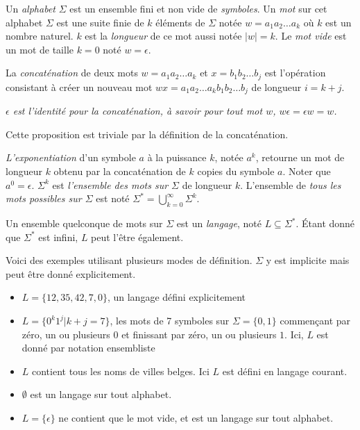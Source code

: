 Un \emph{alphabet} $\Sigma$ est un ensemble fini et non vide de \emph{symboles}. Un \emph{mot} sur cet alphabet $\Sigma$ est une suite finie de $k$ éléments de $\Sigma$ notée $ w = a_1a_2\dots a_k$ où $k$ est un nombre naturel. $k$ est la \emph{longueur} de ce mot aussi notée $|w|=k$. Le \emph{mot vide} est un mot de taille $k=0$ noté $w=\epsilon$.

La \emph{concaténation} de deux mots $w=a_1a_2\dots a_k$ et $x=b_1b_2\dots b_j$ est l'opération consistant à créer un nouveau mot $wx=a_1a_2\dots a_kb_1b_2\dots b_j$ de longueur $i=k+j$.

\begin{proposition}\emph{
$\epsilon$ est \emph{l'identité pour la concaténation}, à savoir pour tout mot $w$, $w\epsilon = \epsilon w = w$.}
\end{proposition}

Cette proposition est triviale par la définition de la concaténation.

\emph{L'exponentiation} d'un symbole $a$ à la puissance $k$, notée $a^k$, retourne un mot de longueur $k$ obtenu par la concaténation de $k$ copies du symbole $a$. Noter que $a^0=\epsilon$. $\Sigma^k$ est \emph{l'ensemble des mots sur $\Sigma$} de longueur $k$. L'ensemble de \emph{tous les mots possibles sur $\Sigma$} est noté $\Sigma^* = \bigcup_{k=0}^{\infty}\Sigma^k$.


Un ensemble quelconque de mots sur $\Sigma$ est un \emph{langage}, noté $L \subseteq \Sigma^*$. Étant donné que $\Sigma^*$ est infini, $L$ peut l'être également.

\begin{example}[Langages] Voici des exemples utilisant plusieurs modes de définition. $\Sigma$ y est implicite mais peut être donné explicitement.
	\begin{itemize}
		\item $L=\{12,35,42,7,0\}$, un langage défini explicitement
		\item $L=\{0^k1^j|k+j=7\}$, les mots de 7 symboles sur $\Sigma=\{0,1\}$ commençant par zéro, un ou plusieurs $0$ et finissant par zéro, un ou plusieurs $1$. Ici, $L$ est donné par notation ensembliste
		\item $L$ contient tous les noms de villes belges. Ici $L$ est défini en langage courant.
		\item $\emptyset$ est un langage sur tout alphabet.
		\item $L=\{\epsilon\}$ ne contient que le mot vide, et est un langage sur tout alphabet.
	\end{itemize}
\end{example}

